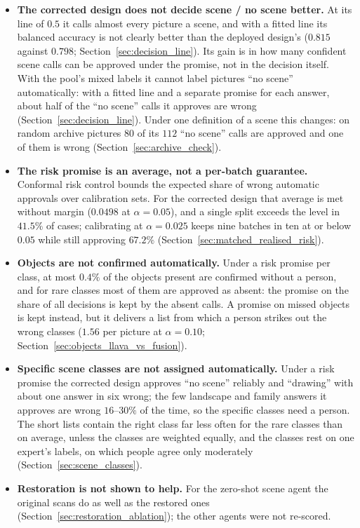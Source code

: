 \documentclass[12pt,a4paper]{report}
\begin{document}
\begin{itemize}
    \item \textbf{The corrected design does not decide scene / no scene better.} At its line of $0.5$ it calls almost every picture a scene, and with a fitted line its balanced accuracy is not clearly better than the deployed design's ($0.815$ against $0.798$; Section~\ref{sec:decision_line}). Its gain is in how many confident scene calls can be approved under the promise, not in the decision itself. With the pool's mixed labels it cannot label pictures ``no scene'' automatically: with a fitted line and a separate promise for each answer, about half of the ``no scene'' calls it approves are wrong (Section~\ref{sec:decision_line}). Under one definition of a scene this changes: on random archive pictures $80$ of its $112$ ``no scene'' calls are approved and one of them is wrong (Section~\ref{sec:archive_check}).
    \item \textbf{The risk promise is an average, not a per-batch guarantee.} Conformal risk control bounds the expected share of wrong automatic approvals over calibration sets. For the corrected design that average is met without margin ($0.0498$ at $\alpha=0.05$), and a single split exceeds the level in $41.5\%$ of cases; calibrating at $\alpha=0.025$ keeps nine batches in ten at or below $0.05$ while still approving $67.2\%$ (Section~\ref{sec:matched_realised_risk}).
    \item \textbf{Objects are not confirmed automatically.} Under a risk promise per class, at most $0.4\%$ of the objects present are confirmed without a person, and for rare classes most of them are approved as absent: the promise on the share of all decisions is kept by the absent calls. A promise on missed objects is kept instead, but it delivers a list from which a person strikes out the wrong classes ($1.56$ per picture at $\alpha=0.10$; Section~\ref{sec:objects_llava_vs_fusion}).
    \item \textbf{Specific scene classes are not assigned automatically.} Under a risk promise the corrected design approves ``no scene'' reliably and ``drawing'' with about one answer in six wrong; the few landscape and family answers it approves are wrong $16$--$30\%$ of the time, so the specific classes need a person. The short lists contain the right class far less often for the rare classes than on average, unless the classes are weighted equally, and the classes rest on one expert's labels, on which people agree only moderately (Section~\ref{sec:scene_classes}).
    \item \textbf{Restoration is not shown to help.} For the zero-shot scene agent the original scans do as well as the restored ones (Section~\ref{sec:restoration_ablation}); the other agents were not re-scored.

\end{itemize}
\end{document}
